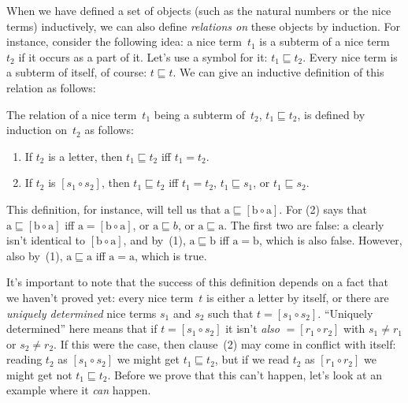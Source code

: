 \documentclass[../../../include/open-logic-section]{subfiles}
\begin{document}

When we have defined a set of objects (such as the natural numbers or
the nice terms) inductively, we can also define \emph{relations on}
these objects by induction.  For instance, consider the following
idea: a nice term~$t_1$ is a subterm of a nice term~$t_2$ if it occurs as
a part of it.  Let's use a symbol for it: $t_1 \sqsubseteq t_2$. Every
nice term is a subterm of itself, of course: $t \sqsubseteq t$. We can
give an inductive definition of this relation as follows:

\begin{defn}
  The relation of a nice term~$t_1$ being a subterm of~$t_2$, $t_1
  \sqsubseteq t_2$, is defined by induction on~$t_2$ as follows:
  \begin{enumerate}
  \item If $t_2$ is a letter, then $t_1 \sqsubseteq t_2$ iff $t_1 = t_2$.
  \item If $t_2$ is $[s_1 \circ s_2]$, then $t_1 \sqsubseteq t_2$ iff $t_1 =
    t_2$, $t_1 \sqsubseteq s_1$, or $t_1 \sqsubseteq s_2$.
  \end{enumerate}
\end{defn}

This definition, for instance, will tell us that $\mathrm{a}
\sqsubseteq [\mathrm{b} \circ \mathrm{a}]$. For (2) says that
$\mathrm{a} \sqsubseteq [\mathrm{b} \circ \mathrm{a}]$ iff $\mathrm{a}
= [\mathrm{b} \circ \mathrm{a}]$, or $\mathrm{a} \sqsubseteq b$, or
$\mathrm{a} \sqsubseteq \mathrm{a}$. The first two are false:
$\mathrm{a}$ clearly isn't identical to $[\mathrm{b} \circ
  \mathrm{a}]$, and by~(1), $\mathrm{a} \sqsubseteq \mathrm{b}$ iff
$\mathrm{a} = \mathrm{b}$, which is also false. However, also by~(1),
$\mathrm{a} \sqsubseteq \mathrm{a}$ iff $\mathrm{a} = \mathrm{a}$,
which is true.

It's important to note that the success of this definition depends on
a fact that we haven't proved yet: every nice term~$t$ is either a
letter by itself, or there are \emph{uniquely determined} nice terms
$s_1$ and $s_2$ such that $t = [s_1 \circ s_2]$.  ``Uniquely
determined'' here means that if $t = [s_1 \circ s_2]$ it isn't
\emph{also} $= [r_1 \circ r_2]$ with $s_1 \neq r_1$ or $s_2 \neq r_2$.
If this were the case, then clause~(2) may come in conflict with
itself: reading $t_2$ as $[s_1 \circ s_2]$ we might get $t_1
\sqsubseteq t_2$, but if we read $t_2$ as $[r_1 \circ r_2]$ we might
get not $t_1 \sqsubseteq t_2$.  Before we prove that this can't
happen, let's look at an example where it \emph{can} happen.
\end{document}
